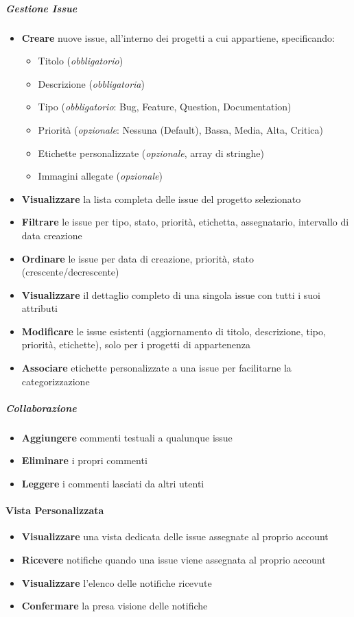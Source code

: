 \subparagraph{Gestione Issue}
\begin{itemize}[leftmargin=1.1em]
\item \textbf{Creare} nuove issue, all'interno dei progetti a cui appartiene, specificando:
  \begin{itemize}
  \item Titolo (\textit{obbligatorio})
  \item Descrizione (\textit{obbligatoria})
  \item Tipo (\textit{obbligatorio}: Bug, Feature, Question, Documentation)
  \item Priorità (\textit{opzionale}: Nessuna (Default), Bassa, Media, Alta, Critica)
  \item Etichette personalizzate (\textit{opzionale}, array di stringhe)
  \item Immagini allegate (\textit{opzionale})
  \end{itemize}
\item \textbf{Visualizzare} la lista completa delle issue del progetto selezionato
\item \textbf{Filtrare} le issue per tipo, stato, priorità, etichetta, assegnatario, intervallo di data creazione
\item \textbf{Ordinare} le issue per data di creazione, priorità, stato (crescente/decrescente)
\item \textbf{Visualizzare} il dettaglio completo di una singola issue con tutti i suoi attributi
\item \textbf{Modificare} le issue esistenti (aggiornamento di titolo, descrizione, tipo, priorità, etichette), solo per i progetti di appartenenza
\item \textbf{Associare} etichette personalizzate a una issue per facilitarne la categorizzazione
\end{itemize}

\subparagraph{Collaborazione}
\begin{itemize}[leftmargin=1.1em]
\item \textbf{Aggiungere} commenti testuali a qualunque issue
\item \textbf{Eliminare} i propri commenti
\item \textbf{Leggere} i commenti lasciati da altri utenti
\end{itemize}

\paragraph{Vista Personalizzata}
\begin{itemize}[leftmargin=1.1em]
\item \textbf{Visualizzare} una vista dedicata delle issue assegnate al proprio account
\item \textbf{Ricevere} notifiche quando una issue viene assegnata al proprio account
\item \textbf{Visualizzare} l'elenco delle notifiche ricevute
\item \textbf{Confermare} la presa visione delle notifiche
\end{itemize}

